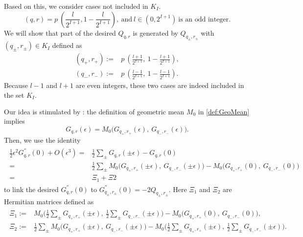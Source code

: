\documentclass{article}
\numberwithin{equation}{section}
\begin{document}
Based on this, we consider cases not included in $K_{I}$.
\begin{equation}\label{eq:oddL}
(q, r) = p\ (  \frac{l}{2^{I+1}},   1 - \frac{l}{2^{I+1}}  ),\ \text{and}\ l\in (0, 2^{I+1})\ \text{is an odd integer}.
\end{equation}
We will show that part of the desired $Q_{q,r}$ is generated by $Q_{q_{\pm},r_{\pm}}$ with $(q_{\pm},r_{\pm})\in K_{I}$ defined as
\begin{align*}
(q_+, r_+) :=& p\ (  \frac{l+1}{2^{I+1}},\ 1 - \frac{l+1}{2^{I+1}}  ),\\ 
(q_{-}, r_{-}) :=&p\ (  \frac{l-1}{2^{I+1}},\   1 - \frac{l-1}{2^{I+1}}  ).
\end{align*} Because $l - 1$ and $l + 1$ are even integers, these two cases
are indeed included in the set $K_I$.

Our idea is stimulated by \cite{ANDO1979203}: the definition of geometric mean $M_0$ in \eqref{def:GeoMean} implies
\begin{equation*}
  G_{q, r}(\epsilon)=M_0\big(G_{q_{+}, r_{+}}(\epsilon),\ G_{q_{-}, r_{-}}(\epsilon)\big).
\end{equation*}
Then, we use the identity
\begin{align}\label{eq:difference1}
\begin{split}
   \frac{1}{2} \epsilon^2 G^{''}_{q,r}(0)+O(\epsilon^3) =&\frac{1}{2}\sum_{\pm}G_{q, r}(\pm \epsilon)-G_{q, r}(0)\\
     =&\frac{1}{2}\sum_{\pm}M_0\big(G_{q_{+}, r_{+}}(\pm\epsilon),\ G_{q_{-}, r_{-}}(\pm\epsilon)\big)-M_0\big(G_{q_{+}, r_{+}}(0),\ G_{q_{-}, r_{-}}(0)\big)\\
     =&\Xi_1+\Xi2
\end{split}
\end{align} to link the desired $G^{''}_{q,r}(0)$ to $G^{''}_{q_{\pm},r_{\pm}}(0)=-2Q_{q_{\pm},r_{\pm}}$. Here $\Xi_1$ and $\Xi_2$ are Hermitian matrices defined as
\begin{align*}
\begin{split}
  \Xi_1:=&M_0 \Big( \frac{1}{2} \sum_{\pm}G_{q_+, r_+}(\pm\epsilon)  , \ \frac{1}{2}  \sum_{\pm}G_{q_-, r_-}(\pm\epsilon)   \Big)-M_0\big(G_{q_{+}, r_{+}}(0),\ G_{q_{-}, r_{-}}(0)\big),\\
  \Xi_2:=&\frac{1}{2}\sum_{\pm}M_0\big(G_{q_{+}, r_{+}}(\pm\epsilon),\ G_{q_{-}, r_{-}}(\pm\epsilon)\big)-M_0 \Big( \frac{1}{2} \sum_{\pm}G_{q_+, r_+}(\pm\epsilon)  , \ \frac{1}{2}  \sum_{\pm}G_{q_-, r_-}(\pm\epsilon)   \Big).
\end{split}
\end{align*}
\end{document}
